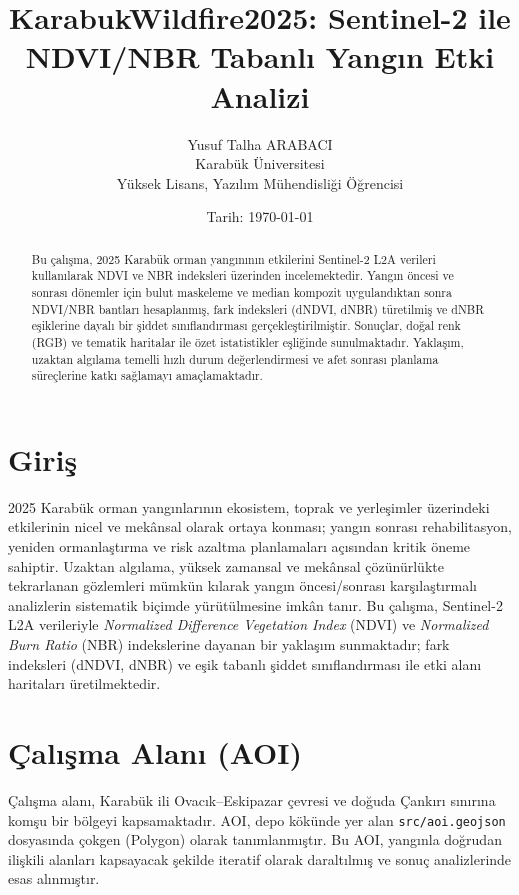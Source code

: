 \documentclass[11pt,a4paper]{article}
\title{KarabukWildfire2025: Sentinel-2 ile NDVI/NBR Tabanlı Yangın Etki Analizi}
\author{Yusuf Talha ARABACI\\Karabük Üniversitesi\\Yüksek Lisans, Yazılım Mühendisliği Öğrencisi}
\date{Tarih: \today}
\begin{document}
\maketitle
\thispagestyle{empty}

\clearpage
\tableofcontents
\clearpage

\renewcommand{\abstractname}{Özet}
\begin{abstract}
Bu çalışma, 2025 Karabük orman yangınının etkilerini Sentinel-2 L2A verileri kullanılarak
NDVI ve NBR indeksleri üzerinden incelemektedir. Yangın öncesi ve sonrası dönemler için
bulut maskeleme ve median kompozit uygulandıktan sonra NDVI/NBR bantları hesaplanmış,
fark indeksleri (dNDVI, dNBR) türetilmiş ve dNBR eşiklerine dayalı bir şiddet sınıflandırması
gerçekleştirilmiştir. Sonuçlar, doğal renk (RGB) ve tematik haritalar ile özet istatistikler
eşliğinde sunulmaktadır. Yaklaşım, uzaktan algılama temelli hızlı durum değerlendirmesi ve
afet sonrası planlama süreçlerine katkı sağlamayı amaçlamaktadır.
\end{abstract}

\clearpage

\section{Giriş}
2025 Karabük orman yangınlarının ekosistem, toprak ve yerleşimler üzerindeki etkilerinin
nicel ve mekânsal olarak ortaya konması; yangın sonrası rehabilitasyon, yeniden
ormanlaştırma ve risk azaltma planlamaları açısından kritik öneme sahiptir. Uzaktan
algılama, yüksek zamansal ve mekânsal çözünürlükte tekrarlanan gözlemleri mümkün kılarak
yangın öncesi/sonrası karşılaştırmalı analizlerin sistematik biçimde yürütülmesine imkân
tanır. Bu çalışma, Sentinel-2 L2A verileriyle \emph{Normalized Difference Vegetation Index}
(NDVI) ve \emph{Normalized Burn Ratio} (NBR) indekslerine dayanan bir yaklaşım
sunmaktadır; fark indeksleri (dNDVI, dNBR) ve eşik tabanlı şiddet sınıflandırması ile
etki alanı haritaları üretilmektedir.

\section{Çalışma Alanı (AOI)}
Çalışma alanı, Karabük ili Ovacık--Eskipazar çevresi ve doğuda Çankırı sınırına
komşu bir bölgeyi kapsamaktadır. AOI, depo kökünde yer alan \texttt{src/aoi.geojson}
dosyasında çokgen (Polygon) olarak tanımlanmıştır. Bu AOI, yangınla doğrudan ilişkili
alanları kapsayacak şekilde iteratif olarak daraltılmış ve sonuç analizlerinde esas
alınmıştır.
\end{document}
